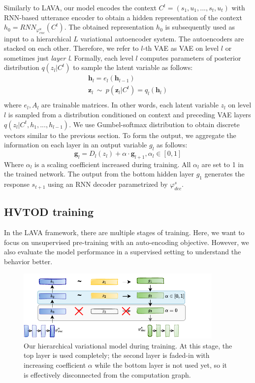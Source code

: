 Similarly to LAVA, our model encodes the context $C^t = (s_1,u_1,...,s_t,u_t)$ with RNN-based utterance encoder to obtain a hidden representation of the context $h_0 = RNN_{\varphi_{enc}^u} (C^t)$.
The obtained representation $h_0$ is subsequently used as input to a hierarchical $L$ variational autoencoder system.
The autoencoders are stacked on each other.
Therefore, we refer to $l$-th VAE as VAE on level $l$ or sometimes just \emph{layer l}.
Formally, each level $l$ computes parameters of posterior distribution $q(z_l|C^t)$ to sample the latent variable as follows:
\begin{equation}
\begin{split}    
    \mathbf{h}_l = e_l(\mathbf{h}_{l-1}) \\
    \mathbf{z}_l~\mathtt{\sim}~p(\mathbf{z}_l|C^t) = q_l(\mathbf{h}_l) \\
\end{split}
\end{equation}
where $e_l, A_l$ are trainable matrices.
In other words, each latent variable $z_l$ on level $l$ is sampled from a  distribution conditioned on context and preceding VAE layers $q(z_l|C^t,h_1,...,h_{l-1})$.
We use Gumbel-softmax distribution to obtain discrete vectors similar to the previous section.
To form the output, we aggregate the information on each layer in an output variable $g_l$ as follows:
\begin{equation}
\mathbf{g}_l = D_l(z_l) + \alpha \cdot \mathbf{g}_{l+1}, \alpha_l \in [0, 1]
\end{equation}
Where $\alpha_l$ is a scaling coefficient increased during training. All $\alpha_l$ are set to 1 in the trained network.
The output from the bottom hidden layer $g_1$ generates the response $s_{t+1}$  using an RNN decoder parametrized by $\varphi^s_{dec}$.

\subsection{HVTOD training}
In the LAVA framework, there are multiple stages of training.
Here, we want to focus on unsupervised pre-training with an auto-encoding objective.
However, we also evaluate the model performance in a supervised setting to understand the behavior better.
\begin{figure}[h]
    \centering
    \includegraphics[width=0.9\textwidth]{images/HLAVA-fadein.pdf}
    \caption{Our hierarchical variational model during training. At this stage, the top layer is used completely; the second layer is faded-in with increasing coefficient $\alpha$ while the bottom layer is not used yet, so it is effectively disconnected from the computation graph.}
    \label{05:fig:HVTOD-fadein}
\end{figure}

